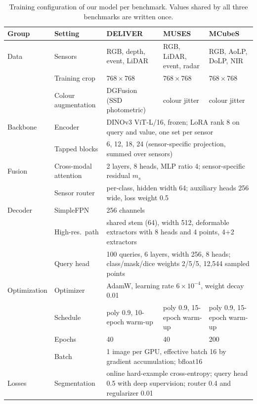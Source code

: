 \documentclass[10pt]{article}
\newcommand{\tabsetup}{\footnotesize\setlength{\tabcolsep}{2.5pt}\renewcommand{\arraystretch}{1.1}}
\begin{document}
\begin{table}[!htbp]
\caption{Training configuration of our model per benchmark. Values shared by all three benchmarks are written once.}
\label{tab:train}
\centering\tabsetup
\begin{tabular*}{\textwidth}{@{\extracolsep{\fill}}lllll@{}}
\toprule
Group & Setting & DELIVER & MUSES & MCubeS \\
\midrule
Data & Sensors & RGB, depth, event, LiDAR & RGB, LiDAR, event, radar & RGB, AoLP, DoLP, NIR \\
 & Training crop & $768\times768$ & $768\times768$ & $768\times768$ \\
 & Colour augmentation & DGFusion~\cite{dgfusion2026} (SSD photometric) & colour jitter & colour jitter \\
\midrule
Backbone & Encoder & \multicolumn{3}{l}{DINOv3 ViT-L/16, frozen; LoRA rank 8 on query and value, one set per sensor} \\
 & Tapped blocks & \multicolumn{3}{l}{6, 12, 18, 24 (sensor-specific projection, summed over sensors)} \\
\midrule
Fusion & Cross-modal attention & \multicolumn{3}{l}{2 layers, 8 heads, MLP ratio 4; sensor-specific residual $m_s$} \\
 & Sensor router & \multicolumn{3}{l}{per-class, hidden width 64; auxiliary heads 256 wide, loss weight 0.5} \\
\midrule
Decoder & SimpleFPN & \multicolumn{3}{l}{256 channels} \\
 & High-res.\ path & \multicolumn{3}{l}{shared stem (64), width 512, deformable extractors with 8 heads and 4 points, 4+2 extractors} \\
 & Query head & \multicolumn{3}{l}{100 queries, 6 layers, width 256, 8 heads; class/mask/dice weights 2/5/5, 12{,}544 sampled points} \\
\midrule
Optimization & Optimizer & \multicolumn{3}{l}{AdamW, learning rate $6\times10^{-4}$, weight decay 0.01} \\
 & Schedule & poly 0.9, 10-epoch warm-up & poly 0.9, 15-epoch warm-up & poly 0.9, 15-epoch warm-up \\
 & Epochs & 40 & 40 & 200 \\
 & Batch & \multicolumn{3}{l}{1 image per GPU, effective batch 16 by gradient accumulation; bfloat16} \\
\midrule
Losses & Segmentation & \multicolumn{3}{l}{online hard-example cross-entropy; query head 0.5 with deep supervision; router 0.4 and regularizer 0.01} \\

\end{tabular*}
\end{table}
\end{document}
